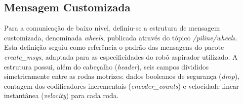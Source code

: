 \subsection{Mensagem Customizada}

Para a comunicação de baixo nível, definiu-se a estrutura de mensagem customizada, denominada \textit{wheels}, publicada através do tópico \textit{/piline/wheels}. Esta definição seguiu como referência o padrão das mensagens do pacote \textit{create\_msgs}, adaptada para as especificidades do robô aspirador utilizado. A estrutura possui, além do cabeçalho (\textit{header}), seis campos divididos simetricamente entre as rodas motrizes: dados booleanos de segurança (\textit{drop}), contagem dos codificadores incrementais (\textit{encoder\_counts}) e velocidade linear instantânea (\textit{velocity}) para cada roda.